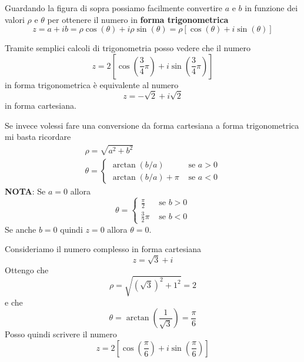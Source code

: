 Guardando la figura di sopra possiamo facilmente convertire $a$ e $b$ in funzione dei valori
$\rho$ e $\theta$ per ottenere il numero in \textbf{forma trigonometrica}
\begin{equation*}
	z = a + ib = \rho \cos{(\theta)} + i \rho \sin{(\theta)} =
	\rho [\cos{(\theta)} + i \sin{(\theta)}]
\end{equation*}

\begin{example}
	Tramite semplici calcoli di trigonometria posso vedere che il numero
	\begin{equation*}
		z = 2 \left[ \cos{\left( \frac{3}{4} \pi \right)} +
			i \sin{\left( \frac{3}{4} \pi \right)} \right]
	\end{equation*}
	in forma trigonometrica \`e equivalente al numero
	\begin{equation*}
		z = -\sqrt{2} + i\sqrt{2}
	\end{equation*}
	in forma cartesiana.
\end{example}

Se invece volessi fare una conversione da forma cartesiana a forma trigonometrica mi
basta ricordare
\begin{gather*}
	\rho = \sqrt{a^2 + b^2} \\
	\theta =
	\begin{cases}
		\arctan{(b / a)}       & \text{ se } a > 0 \\
		\arctan{(b / a)} + \pi & \text{ se } a < 0
	\end{cases}
\end{gather*}
\textbf{NOTA}: Se $a = 0$ allora
\begin{equation*}
	\theta =
	\begin{cases}
		\frac{\pi}{2}   & \text{ se } b > 0 \\
		\frac{3}{2} \pi & \text{ se } b < 0
	\end{cases}
\end{equation*}
Se anche $b = 0$ quindi $z = 0$ allora $\theta = 0$.

\begin{example}
	Consideriamo il numero complesso in forma cartesiana
	\begin{equation*}
		z = \sqrt{3} + i
	\end{equation*}
	Ottengo che
	\begin{equation*}
		\rho = \sqrt{\left( \sqrt{3} \right)^2 + 1^2} = 2
	\end{equation*}
	e che
	\begin{equation*}
		\theta = \arctan{\left( \frac{1}{\sqrt{3}} \right)} = \frac{\pi}{6}
	\end{equation*}
	Posso quindi scrivere il numero
	\begin{equation*}
		z = 2 \left[ \cos{\left( \frac{\pi}{6} \right)}
			+ i  \sin{\left( \frac{\pi}{6} \right)} \right]
	\end{equation*}
\end{example}

